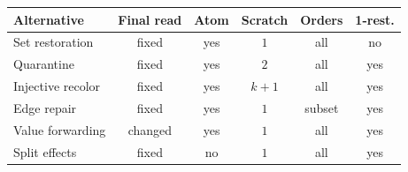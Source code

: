 \begin{tabular}{lccccc}
\toprule
Alternative & Final read & Atom & Scratch & Orders & 1-rest.\\
\midrule
Set restoration & fixed & yes & $1$ & all & no\\
Quarantine & fixed & yes & $2$ & all & yes\\
Injective recolor & fixed & yes & $k+1$ & all & yes\\
Edge repair & fixed & yes & $1$ & subset & yes\\
Value forwarding & changed & yes & $1$ & all & yes\\
Split effects & fixed & no & $1$ & all & yes\\
\bottomrule
\end{tabular}
